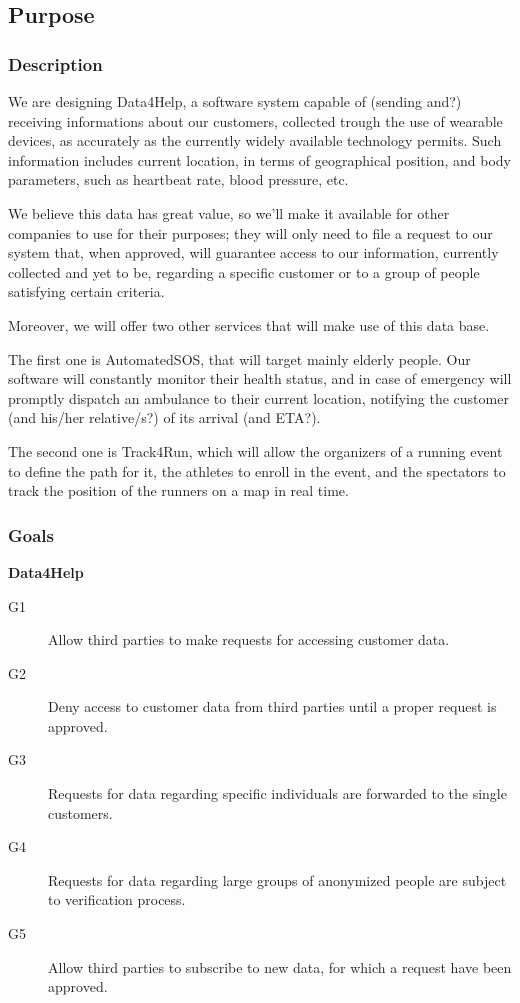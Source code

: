 \documentclass[../main.tex]{subfiles}
\begin{document}
\subsection{Purpose}

\subsubsection{Description}
We are designing Data4Help, a software system capable of (sending and?) receiving informations about our customers, collected trough the use of wearable devices, as accurately as the currently widely available technology permits.
Such information includes current location, in terms of geographical position, and body parameters, such as heartbeat rate, blood pressure, etc.

We believe this data has great value, so we'll make it available for other companies to use for their purposes; they will only need to file a request to our system that, when approved, will guarantee access to our information, currently collected and yet to be, regarding a specific customer or to a group of people satisfying certain criteria.

Moreover, we will offer two other services that will make use of this data base.

The first one is AutomatedSOS, that will target mainly elderly people. Our software will constantly monitor their health status, and in case of emergency will promptly dispatch an ambulance to their current location, notifying the customer (and his/her relative/s?) of its arrival (and ETA?).

The second one is Track4Run, which will allow the organizers of a running event to define the path for it, the athletes to enroll in the event, and the spectators to track the position of the runners on a map in real time.


\subsubsection{Goals}


{\bf Data4Help}
\begin{description}
	\item [G1]  Allow third parties to make requests for accessing customer data.
	\item [G2]  Deny access to customer data from third parties until a proper request is approved.
	\item [G3]  Requests for data regarding specific individuals are forwarded to the single customers.
	\item [G4]  Requests for data regarding large groups of anonymized people are subject to verification process.
	\item [G5]  Allow third parties to subscribe to new data, for which a request have been approved.
\end{description}
\end{document}
